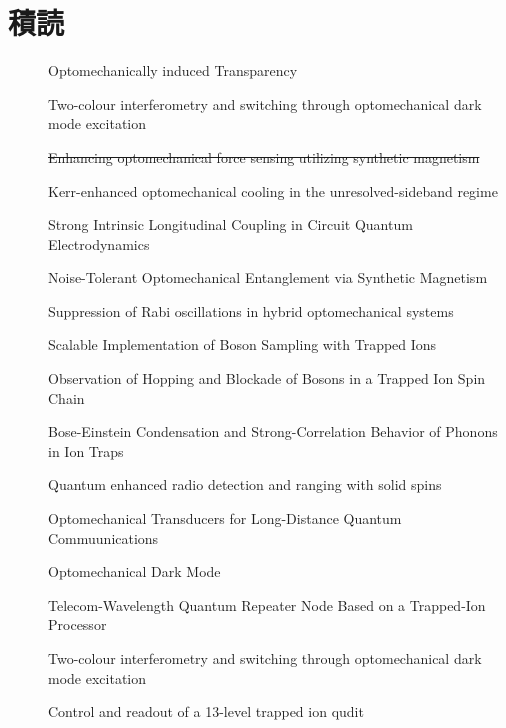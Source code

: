 \documentclass{report}
\begin{document}
  \chapter*{積読}
    \begin{description}
      \item[\cite{science.1195596}] Optomechanically induced Transparency
      \item[\cite{lake2020two}] Two-colour interferometry and switching through optomechanical dark mode excitation
      \item[\cite{PhysRevA.111.053508}] \sout{Enhancing optomechanical force sensing utilizing synthetic magnetism}
      \item[\cite{PhysRevA.111.053505}] Kerr-enhanced optomechanical cooling in the unresolved-sideband regime
      \item[\cite{PhysRevLett.134.153603}] Strong Intrinsic Longitudinal Coupling in Circuit Quantum Electrodynamics
      \item[\cite{PhysRevLett.129.063602}] Noise-Tolerant Optomechanical Entanglement via Synthetic Magnetism
      \item[\cite{PhysRevA.92.043822}] Suppression of Rabi oscillations in hybrid optomechanical systems
      \item[\cite{PhysRevLett.112.050504}] Scalable Implementation of Boson Sampling with Trapped Ions
      \item[\cite{PhysRevLett.120.073001}] Observation of Hopping and Blockade of Bosons in a Trapped Ion Spin Chain
      \item[\cite{PhysRevLett.93.263602}] Bose-Einstein Condensation and Strong-Correlation Behavior of Phonons in Ion Traps
      \item[\cite{chen2023quantum}] Quantum enhanced radio detection and ranging with solid spins
      \item[\cite{PhysRevLett.105.220501}] Optomechanical Transducers for Long-Distance Quantum Commuunications
      \item[\cite{science.1228370}] Optomechanical Dark Mode
      \item[\cite{PhysRevLett.130.213601}] Telecom-Wavelength Quantum Repeater Node Based on a Trapped-Ion Processor
      \item[\cite{lake2020two}] Two-colour interferometry and switching through optomechanical dark mode excitation
      \item[\cite{low2025control}] Control and readout of a 13-level trapped ion qudit 
    \end{description}
  \printbibliography
\end{document}
